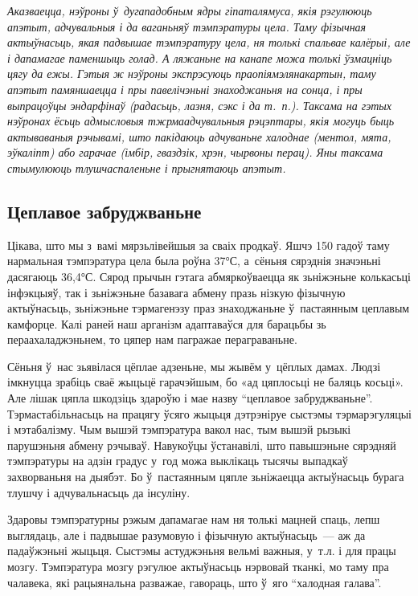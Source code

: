 \emph{Аказваецца, нэўроны ў~дугападобным ядры гіпаталямуса, якія рэгулююць апэтыт, адчувальныя і да ваганьняў тэмпэратуры цела. Таму фізычная актыўнасьць, якая падвышае тэмпэратуру цела, ня толькі спальвае калёрыі, але і дапамагае паменшыць голад. А ляжаньне на канапе можа толькі ўзмацніць цягу да ежы. Гэтыя ж нэўроны экспрэсуюць праопіямэлянакартын, таму апэтыт памяншаецца і пры павелічэньні знаходжаньня на сонца, і пры выпрацоўцы эндарфінаў (радасьць, лазня, сэкс і да т.~п.). Таксама на гэтых нэўронах ёсьць адмысловыя тжрмаадчувальныя рэцэптары, якія могуць быць актываваныя рэчывамі, што пакідаюць адчуваньне халоднае (ментол, мята, эўкаліпт) або гарачае (імбір, гваздзік, хрэн, чырвоны перац). Яны таксама стымулююць тлушчаспаленьне і прыгнятаюць апэтыт.}

\subsection*{Цеплавое забруджваньне}

Цікава, што мы з~вамі мярзьлівейшыя за сваіх продкаў. Яшчэ 150 гадоў таму нармальная тэмпэратура цела была роўна 37°С, а~сёньня сярэднія значэньні дасягаюць 36,4°С. Сярод прычын гэтага абмяркоўваецца як зьніжэньне колькасьці інфэкцыяў, так і зьніжэньне базавага абмену празь нізкую фізычную актыўнасьць, зьніжэньне тэрмагенэзу праз знаходжаньне ў~пастаянным цеплавым камфорце. Калі раней наш арганізм адаптаваўся для барацьбы зь пераахаладжэньнем, то цяпер нам пагражае пераграваньне.

Сёньня ў~нас зьявілася цёплае адзеньне, мы жывём у~цёплых дамах. Людзі імкнуцца зрабіць сваё жыцьцё гарачэйшым, бо «ад цяплосьці не баляць косьці». Але лішак цяпла шкодзіць здароўю і мае назву ``цеплавое забруджваньне''. Тэрмастабільнасьць на працягу ўсяго жыцьця дэтрэніруе сыстэмы тэрмарэгуляцыі і мэтабалізму. Чым вышэй тэмпэратура вакол нас, тым вышэй рызыкі парушэньня абмену рэчываў. Навукоўцы ўстанавілі, што павышэньне сярэдняй тэмпэратуры на адзін градус у~год можа выклікаць тысячы выпадкаў захворваньня на дыябэт. Бо ў~пастаянным цяпле зьніжаецца актыўнасьць бурага тлушчу і адчувальнасьць да інсуліну.

Здаровы тэмпэратурны рэжым дапамагае нам ня толькі мацней спаць, лепш выглядаць, але і падвышае разумовую і фізычную актыўнасьць~--- аж да падаўжэньні жыцьця. Сыстэмы астуджэньня вельмі важныя, у~т.л. і для працы мозгу. Тэмпэратура мозгу рэгулюе актыўнасьць нэрвовай тканкі, мо таму пра чалавека, які рацыянальна разважае, гавораць, што ў~яго ``халодная галава''.

